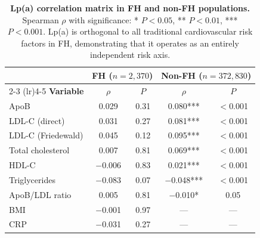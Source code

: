 \documentclass[11pt,a4paper]{article}
\begin{document}
\begin{table}[H]
\centering
\caption{\textbf{Lp(a) correlation matrix in FH and non-FH populations.} Spearman $\rho$ with significance: * $P < 0.05$, ** $P < 0.01$, *** $P < 0.001$. Lp(a) is orthogonal to all traditional cardiovascular risk factors in FH, demonstrating that it operates as an entirely independent risk axis.}
\label{tab:correlations}
\small
\begin{tabular}{@{}lcccc@{}}
\toprule
& \multicolumn{2}{c}{\textbf{FH ($n = 2{,}370$)}} & \multicolumn{2}{c}{\textbf{Non-FH ($n = 372{,}830$)}} \\
\cmidrule(lr){2-3} \cmidrule(lr){4-5}
\textbf{Variable} & $\rho$ & $P$ & $\rho$ & $P$ \\
\midrule
ApoB & 0.029 & 0.31 & 0.080*** & $<$0.001 \\
LDL-C (direct) & 0.031 & 0.27 & 0.081*** & $<$0.001 \\
LDL-C (Friedewald) & 0.045 & 0.12 & 0.095*** & $<$0.001 \\
Total cholesterol & 0.007 & 0.81 & 0.069*** & $<$0.001 \\
HDL-C & $-$0.006 & 0.83 & 0.021*** & $<$0.001 \\
Triglycerides & $-$0.083 & 0.07 & $-$0.048*** & $<$0.001 \\
ApoB/LDL ratio & 0.005 & 0.81 & $-$0.010* & 0.05 \\
BMI & $-$0.001 & 0.97 & --- & --- \\
CRP & $-$0.031 & 0.27 & --- & --- \\
\bottomrule
\end{tabular}
\end{table}
\end{document}
